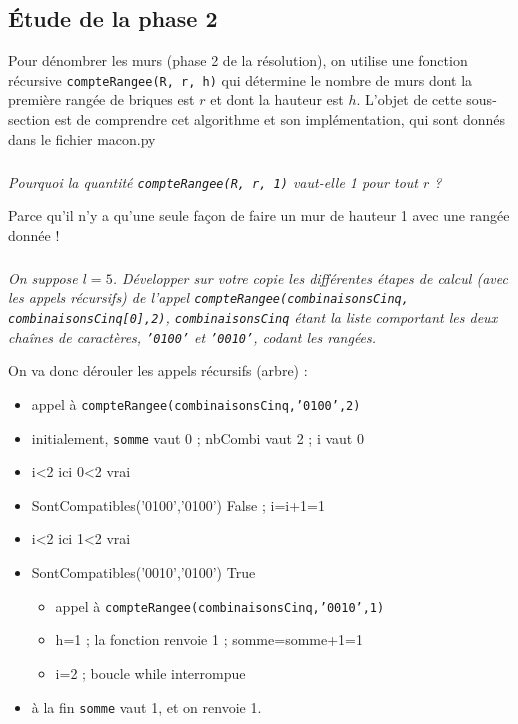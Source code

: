 \subsection*{\'Etude de la phase 2}
\label{ssec:phase2}

Pour dénombrer les murs (phase 2 de la résolution), on utilise une fonction récursive \texttt{compteRangee(R, r, h)}
qui détermine le nombre de murs dont la première rangée de briques est $r$ et dont la hauteur est $h$.
L'objet de cette sous-section est de comprendre cet algorithme et son implémentation, qui sont donnés dans le fichier macon.py%

\subparagraph{}\textit{Pourquoi la quantité \texttt{compteRangee(R, r, 1)} vaut-elle 1 pour tout $r$ ?}


\ifprof
\begin{corrige}
Parce qu'il n'y a qu'une seule façon de faire un mur de hauteur 1 avec une rangée donnée !
\end{corrige}
\else
\fi


\subparagraph{}\textit{On suppose $l = 5$. Développer sur votre copie les différentes étapes de calcul (avec les
appels récursifs) de l'appel \texttt{compteRangee(combinaisonsCinq,}   \texttt{combinaisonsCinq[0],2)}, \texttt{combinaisonsCinq} étant la liste comportant les deux chaînes de caractères, \texttt{'0100'} et \texttt{'0010'}, codant les rangées.
}

\ifprof
\begin{corrige}
On va donc dérouler les appels récursifs (arbre) :
\begin{itemize}
\item appel à \texttt{compteRangee(combinaisonsCinq,'0100',2)}
\item initialement, \texttt{somme} vaut 0 ; nbCombi vaut 2 ; i vaut 0
\item i<2 ici 0<2 vrai
\item SontCompatibles('0100','0100') False ; i=i+1=1
\item i<2 ici 1<2 vrai
\item SontCompatibles('0010','0100') True
\begin{itemize}
\item appel à \texttt{compteRangee(combinaisonsCinq,'0010',1)}
\item h=1 ; la fonction renvoie 1 ; somme=somme+1=1
\item i=2 ; boucle while interrompue
\end{itemize}
\item à la fin \texttt{somme} vaut 1, et on renvoie 1.
\end{itemize}
\end{corrige}
\else
\fi
%
%




